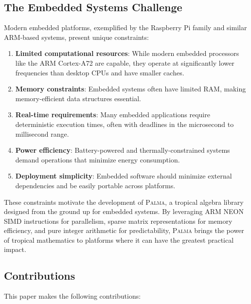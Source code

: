 \documentclass[11pt,a4paper]{article}
\theoremstyle{plain}
\theoremstyle{definition}
\newcommand{\palma}{\textsc{Palma}}
\begin{document}
\subsection{The Embedded Systems Challenge}

Modern embedded platforms, exemplified by the Raspberry Pi family and similar ARM-based systems, present unique constraints:

\begin{enumerate}[leftmargin=*]
    \item \textbf{Limited computational resources}: While modern embedded processors like the ARM Cortex-A72 are capable, they operate at significantly lower frequencies than desktop CPUs and have smaller caches.
    
    \item \textbf{Memory constraints}: Embedded systems often have limited RAM, making memory-efficient data structures essential.
    
    \item \textbf{Real-time requirements}: Many embedded applications require deterministic execution times, often with deadlines in the microsecond to millisecond range.
    
    \item \textbf{Power efficiency}: Battery-powered and thermally-constrained systems demand operations that minimize energy consumption.
    
    \item \textbf{Deployment simplicity}: Embedded software should minimize external dependencies and be easily portable across platforms.
\end{enumerate}

These constraints motivate the development of \palma{}, a tropical algebra library designed from the ground up for embedded systems. By leveraging ARM NEON SIMD instructions for parallelism, sparse matrix representations for memory efficiency, and pure integer arithmetic for predictability, \palma{} brings the power of tropical mathematics to platforms where it can have the greatest practical impact.

\subsection{Contributions}

This paper makes the following contributions:
\end{document}
